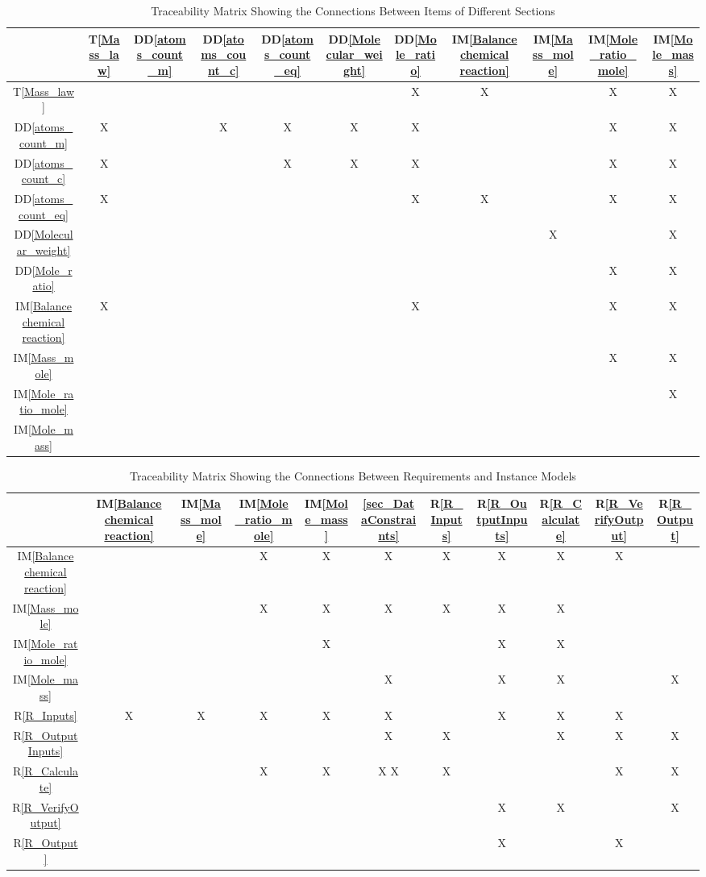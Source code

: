 \documentclass[12pt]{article}
\newcommand{\ddref}[1]{DD\ref{#1}}
\newcommand{\tref}[1]{T\ref{#1}}
\newcommand{\iref}[1]{IM\ref{#1}}
\newcommand{\rref}[1]{R\ref{#1}}
\begin{document}
{\newpage

\begin{table}[h!]
\centering
\begin{tabular}{|c|c|c|c|c|c|c|c|c|c|c|}
\hline        
	& \tref{Mass_law}& \ddref{atoms_count_m}& \ddref{atoms_count_c}&\ddref{atoms_count_eq}&  \ddref{Molecular_weight}& \ddref{Mole_ratio} & \iref{Balance chemical reaction}& \iref{Mass_mole}& \iref{Mole_ratio_mole}& \iref{Mole_mass} \\
\hline
\tref{Mass_law}     & & & & & & X&X & & X&X\\ \hline
\ddref{atoms_count_m} &X & & X&X & X& X& & &X &X\\ \hline
\ddref{atoms_count_c} & X& & & X& X&X & & & X&X\\ \hline
\ddref{atoms_count_eq} &X & & & & & X& X& &X &X\\ \hline
\ddref{Molecular_weight} & & & & & & & &X & &X\\ \hline
\ddref{Mole_ratio}  & & & & & & & & & X&X\\ \hline
\iref{Balance chemical reaction} & X& & & & & X& & &X &X\\ \hline
\iref{Mass_mole}      & & & & & & & & & X&X\\ \hline
\iref{Mole_ratio_mole}    & & & & & & & & & &X\\ \hline
\iref{Mole_mass}    & & & & & & & & & &\\ \hline
\hline
\end{tabular}
\caption{Traceability Matrix Showing the Connections Between Items of Different Sections}
\label{Table:trace}
\end{table}

\begin{table}[h!]
\centering
\begin{tabular}{|c|c|c|c|c|c|c|c|c|c|c|}
\hline
	& \iref{Balance chemical reaction} & \iref{Mass_mole}& \iref{Mole_ratio_mole}& \iref{Mole_mass} & \ref{sec_DataConstraints}& \rref{R_Inputs}& \rref{R_OutputInputs} & \rref{R_Calculate} & \rref{R_VerifyOutput}& \rref{R_Output} \\
\hline
\iref{Balance chemical reaction}  & & & X& X&X & X& X& X& X& \\ \hline
\iref{Mass_mole}            & & & X&X & X& X&X & X& & \\ \hline
\iref{Mole_ratio_mole}     & & & & X& & &X &X & & \\ \hline
\iref{Mole_mass}             & & & & &X & &X & X& & X\\ \hline
\rref{R_Inputs}                &X & X&X &X & X& & X& X&X & \\ \hline
\rref{R_OutputInputs}    & & & & & X& X& & X&X &X \\ \hline
\rref{R_Calculate}    & & & X& X&X X& X& & &X &X \\ \hline
\rref{R_VerifyOutput}   & & & & & & & X&X & & X\\ \hline
\rref{R_Output}      & & & & & & & X& & X& \\ \hline
\hline
\end{tabular}
\caption{Traceability Matrix Showing the Connections Between Requirements and Instance Models}
\label{Table:R_trace}
\end{table}
}
\newpage
\end{document}

